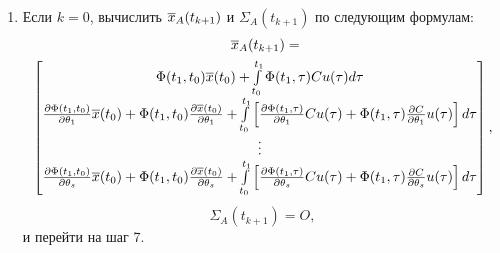 \documentclass[a4paper,14pt]{extarticle}
\newcommand{\pd}[2]{\frac{\partial #1}{\partial #2}}
\begin{document}
\begin{enumerate}
	\item Если $k=0$, вычислить $\overline{x}_A(t_{k+1})$ и $\Sigma_A(t_{k+1})$ по
		следующим формулам:
		\begin{align*}
			\ol{x}_A(t_{k+1}) = \hspace{0.4\textwidth} \\
		\begin{bmatrix}
			\Phi(t_1, t_0) \ol{x}(t_0) + \int\limits_{t_0}^{t_1} \Phi(t_1, \tau)
				C u(\tau) d\tau \\
			\pd{\Phi(t_1, t_0)}{\theta_1} \ol{x}(t_0) + \Phi(t_1, t_0)
				\pd{\ol{x}(t_0)}{\theta_1} + \int\limits_{t_0}^{t_1} 
				\left[ \pd{\Phi(t_1, \tau)}{\theta_1} Cu(\tau) + \Phi(t_1, \tau) 
				\pd{C}{\theta_1} u(\tau) \right] d\tau \\
			\vdots \\
			\pd{\Phi(t_1, t_0)}{\theta_s} \ol{x}(t_0) + \Phi(t_1, t_0)
				\pd{\ol{x}(t_0)}{\theta_s} + \int\limits_{t_0}^{t_1} 
				\left[ \pd{\Phi(t_1, \tau)}{\theta_s} Cu(\tau) + \Phi(t_1, \tau) 
				\pd{C}{\theta_s} u(\tau) \right] d\tau 
		\end{bmatrix},
	\end{align*}
		\[
			\Sigma_A(t_{k+1}) = O,
		\]
	и перейти на шаг 7.


\end{enumerate}
\end{document}
